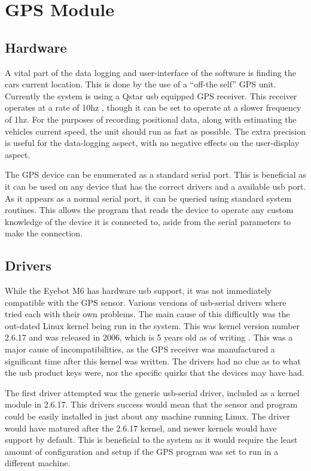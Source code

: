 

\section{GPS Module}

\subsection{Hardware}

A vital part of the data logging and user-interface of the software is finding the cars current location. This is done by the use of a “off-the self” GPS unit. Currently the system is using a Qstar usb equipped GPS receiver. This receiver operates at a rate of 10hz , though it can be set to operate at a slower frequency of 1hz. For the purposes of recording positional data, along with estimating the vehicles current speed, the unit should run as fast as possible. The extra precision is useful for the data-logging aspect, with no negative effects on the user-display aspect.  

The GPS device can be enumerated as a standard serial port. This is beneficial as it can be used on any device that has the correct drivers and a available usb port. As it appears as a normal serial port, it can be queried using standard system routines. This allows the program that reads the device to operate any custom knowledge of the device it is connected to, aside from the serial parameters to make the connection. 

\subsection{ Drivers}
\label{sec:gpsdrivers}

While the Eyebot M6 has hardware usb support, it was not immediately compatible with the GPS sensor. Various versions of usb-serial drivers where tried each with their own problems. The main cause of this difficultly was the out-dated Linux kernel being run in the system. This was kernel version number 2.6.17 and was released in 2006, which is 5 years old as of writing \cite{osnews}. This was a major cause of incompatibilities, as the GPS receiver was manufactured a significant time after this kernel was written. The drivers had no clue as to what the usb product keys were, nor the specific quirks that the devices may have had.

The first driver attempted was the generic usb-serial driver, included as a kernel module in 2.6.17. This drivers success would mean that the sensor and program could be easily installed in just about any machine running Linux. The driver would have matured after the 2.6.17 kernel, and newer kernels would have support by default. This is beneficial to the system as it would require the least amount of configuration and setup if the GPS program was set to run in a different machine.

